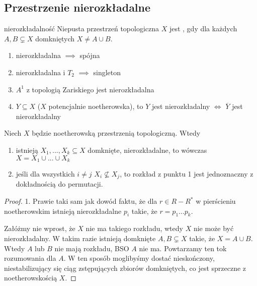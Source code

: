 \subsection{Przestrzenie nierozkładalne}

\begin{definition}{nierozkładalność}{}
  Niepusta przestrzeń topologiczna $X$ jest , gdy dla każdych $A, B\subsetneq X$ domkniętych $X\neq A\cup B$.
\end{definition}

\begin{remark}{}{}
  \begin{enumerate}
    \item nierozkładalna $\implies$ spójna
    \item nierozkładalna i $T_2$ $\implies$ singleton
    \item $A^1$ z topologią Zariskiego jest nierozkładalna
    \item $Y\subseteq X$ ($X$ potencjalnie noetherowska), to $Y$ jest nierozkładalny $\iff$ $\overline{Y}$ jest nierozkładalny
  \end{enumerate}
\end{remark}

\begin{proposition}{}{}
  Niech $X$ będzie noetherowską przestrzenią topologiczną. Wtedy 
  \begin{enumerate}
    \item istnieją $X_1,..., X_k\subseteq X$ domknięte, nierozkładalne, to wówczas $X=X_1\cup...\cup X_k$
    \item jeśli dla wszystkich $i\neq j$ $X_i\not\subseteq X_j$, to rozkład z punktu 1 jest jednoznaczny z dokładnością do permutacji.
  \end{enumerate}
\end{proposition}

\begin{proof}
  1. Prawie taki sam jak dowód faktu, że dla $r\in R-R^*$ w pierścieniu noetherowskim istnieją nierozkładalne $p_i$ takie, że $r=p_1...p_k$.

  Załóżmy nie wprost, że $X$ nie ma takiego rozkładu, wtedy $X$ nie może być nierozkładalny. W takim razie istnieją domknięte $A, B\subsetneq X$ takie, że $X=A\cup B$. Wtedy $A$ lub $B$ nie mają rozkładu, BSO $A$ nie ma. Powtarzamy ten tok rozumowania dla $A$. W ten sposób moglibyśmy dostać nieskończony, niestabilizujący się ciąg zstępujących zbiorów domkniętych, co jest sprzeczne z noetherowskością $X$.
\end{proof}


